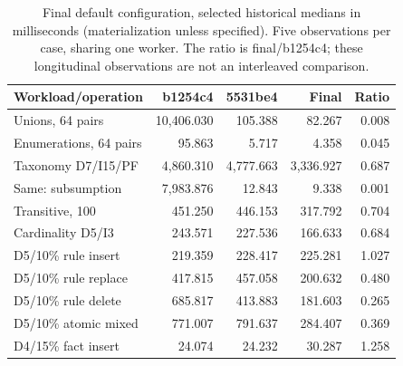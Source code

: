 \begin{table}[ht]
\caption{Final default configuration, selected historical medians in milliseconds (materialization unless specified). Five observations per case, sharing one worker. The ratio is final/b1254c4; these longitudinal observations are not an interleaved comparison.}
\label{tab:final-production}
\centering\small
\begin{tabular}{@{}lrrrr@{}}
\toprule
Workload/operation & b1254c4 & 5531be4 & Final & Ratio \\
\midrule
Unions, 64 pairs & 10,406.030 & 105.388 & 82.267 & 0.008 \\
Enumerations, 64 pairs & 95.863 & 5.717 & 4.358 & 0.045 \\
Taxonomy D7/I15/PF & 4,860.310 & 4,777.663 & 3,336.927 & 0.687 \\
Same: subsumption & 7,983.876 & 12.843 & 9.338 & 0.001 \\
Transitive, 100 & 451.250 & 446.153 & 317.792 & 0.704 \\
Cardinality D5/I3 & 243.571 & 227.536 & 166.633 & 0.684 \\
D5/10\% rule insert & 219.359 & 228.417 & 225.281 & 1.027 \\
D5/10\% rule replace & 417.815 & 457.058 & 200.632 & 0.480 \\
D5/10\% rule delete & 685.817 & 413.883 & 181.603 & 0.265 \\
D5/10\% atomic mixed & 771.007 & 791.637 & 284.407 & 0.369 \\
D4/15\% fact insert & 24.074 & 24.232 & 30.287 & 1.258 \\
\bottomrule
\end{tabular}
\end{table}

